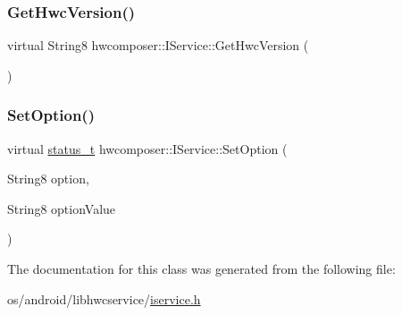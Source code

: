 \mbox{\label{classhwcomposer_1_1IService_a74bd053098590c03cf3e374f396222f8}} 
\subsubsection{\texorpdfstring{Get\+Hwc\+Version()}{GetHwcVersion()}}
{\footnotesize\ttfamily virtual String8 hwcomposer\+::\+I\+Service\+::\+Get\+Hwc\+Version (\begin{DoxyParamCaption}{ }\end{DoxyParamCaption})\hspace{0.3cm}{\ttfamily [pure virtual]}}

\mbox{\label{classhwcomposer_1_1IService_a72bf2c3bbfbeeb72a2d1a4cbaadc97b7}} 
\subsubsection{\texorpdfstring{Set\+Option()}{SetOption()}}
{\footnotesize\ttfamily virtual \mbox{\hyperlink{hwcserviceapi_8h_a3806fb2027d9a316d8ca8d9b8b8eb96f}{status\+\_\+t}} hwcomposer\+::\+I\+Service\+::\+Set\+Option (\begin{DoxyParamCaption}\item[{String8}]{option,  }\item[{String8}]{option\+Value }\end{DoxyParamCaption})\hspace{0.3cm}{\ttfamily [pure virtual]}}



The documentation for this class was generated from the following file\+:\begin{DoxyCompactItemize}
\item 
os/android/libhwcservice/\mbox{\hyperlink{iservice_8h}{iservice.\+h}}\end{DoxyCompactItemize}
